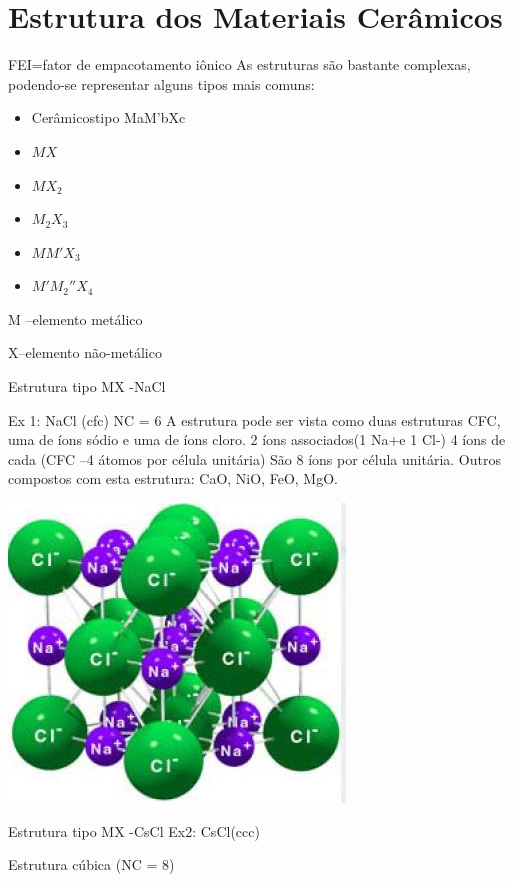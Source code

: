 \section{Estrutura dos Materiais Cerâmicos}
FEI=fator de empacotamento iônico
As estruturas são bastante complexas, podendo-se representar alguns tipos mais comuns:


\begin{itemize}
	\item Cerâmicostipo MaM’bXc
	\item $MX$
	\item $MX_{2}$
	\item $M_{2}X_{3}$
	\item $MM'X_{3}$
	\item $M'M_{2}''X_{4}$
\end{itemize}

M –elemento metálico

X–elemento não-metálico



Estrutura tipo MX -NaCl

Ex 1: NaCl (cfc)
NC = 6
A estrutura pode ser vista como duas estruturas CFC, uma de íons sódio e uma de íons cloro.
2 íons associados(1 Na+e 1 Cl-)
4 íons de cada (CFC –4 átomos por célula unitária)
São 8 íons por célula unitária.
Outros compostos com esta estrutura: CaO, NiO, FeO, MgO.

 \includegraphics[scale=0.5,trim={0 0 0 0}]{figures/NaCl}


Estrutura tipo MX -CsCl
Ex2: CsCl(ccc)

Estrutura cúbica (NC = 8)

